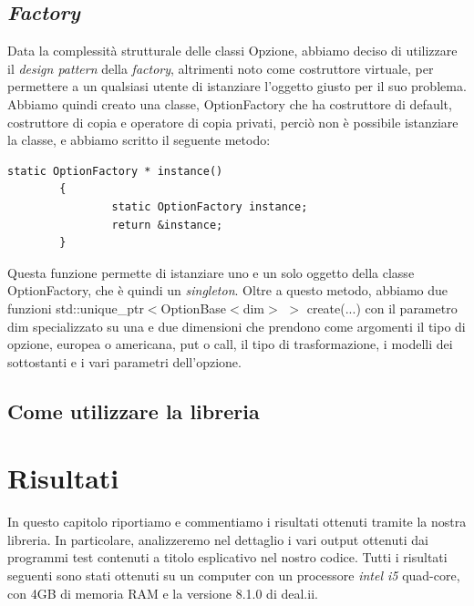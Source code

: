 \documentclass[a4paper,10pt]{report}
\theoremstyle{plain}
\theoremstyle{definition}
\theoremstyle{remark}
\begin{document}
\section{\emph{Factory}}
Data la complessit\`a strutturale delle classi Opzione, abbiamo deciso di utilizzare il \emph{design pattern} della \emph{factory}, altrimenti noto come costruttore virtuale, per permettere a un qualsiasi utente di istanziare l'oggetto giusto per il suo problema. Abbiamo quindi creato una classe, \textsf{OptionFactory} che ha costruttore di default, costruttore di copia e operatore di copia privati, perci\`o non \`e possibile istanziare la classe, e abbiamo scritto il seguente metodo:
\begin{lstlisting}
static OptionFactory * instance()
        {
                static OptionFactory instance;
                return &instance;
        }
\end{lstlisting}
Questa funzione permette di istanziare uno e un solo oggetto della classe \textsf{OptionFactory}, che \`e quindi un \emph{singleton}. Oltre a questo metodo, abbiamo due funzioni \textsf{std::unique\_ptr$<$OptionBase$<$dim$>$ $>$ create(...)} con il parametro \textsf{dim} specializzato su una e due dimensioni che prendono come argomenti il tipo di opzione, europea o americana, put o call, il tipo di trasformazione, i modelli dei sottostanti e i vari parametri dell'opzione.
\section{Come utilizzare la libreria}
\chapter{Risultati}
In questo capitolo riportiamo e commentiamo i risultati ottenuti tramite la nostra libreria. In particolare, analizzeremo nel dettaglio i vari output ottenuti dai programmi \textsf{test} contenuti a titolo esplicativo nel nostro codice. Tutti i risultati seguenti sono stati ottenuti su un computer con un processore \emph{intel i5} quad-core, con 4GB di memoria RAM e la versione 8.1.0 di \textsf{deal.ii}.
\end{document}
